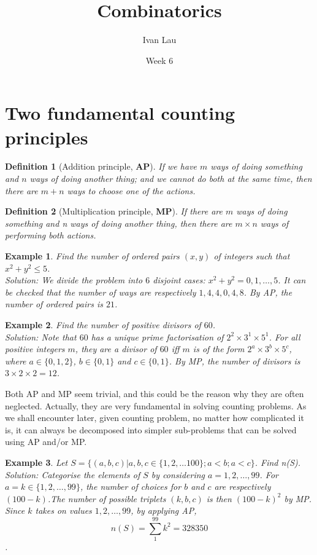 \documentclass[11pt,a5paper]{article}
\title{\textbf{Combinatorics}}
\date{Week 6}
\author{Ivan Lau\\}
\newtheorem{definition}{Definition}
\newtheorem{example}{Example}
\begin{document}
\maketitle


\section{Two fundamental counting principles}

\begin{definition}[Addition principle, \textbf{AP}]
If we have $m$ ways of doing something and $n$ ways of doing another thing; and we cannot do both at the same time, then there are $m+n$ ways to choose one of the actions.
\end{definition}

\begin{definition}[Multiplication principle, \textbf{MP}]
If there are $m$ ways of doing something and n ways of doing another thing, then there are $m \times n$ ways of performing both actions.
\end{definition}

\begin{example} Find the number of ordered pairs $(x,y)$ of integers such that $x^2+y^2 \le 5$.\\
\textit{Solution}: We divide the problem into $6$ disjoint cases: $x^2+y^2 = 0,1,…,5$. It can be checked that the number of ways are respectively $1,4,4,0,4,8$. By AP, the number of ordered pairs is $21$.
\end{example}

\begin{example} Find the number of positive divisors of $60$. \\
\textit{Solution}: Note that $60$ has a unique prime factorisation of $2^2 \times 3^1 \times 5^1$. For all positive integers $m$, they are a divisor of $60$ iff $m$ is of the form $2^a \times 3^b \times 5^c$, where $a \in \{0,1,2\}$, $b \in \{0,1\}$ and $c \in \{0,1\}$. By MP, the number of divisors is $3 \times 2 \times 2 = 12$.
\end{example}

\noindent Both AP and MP seem trivial, and this could be the reason why they are often neglected. Actually, they are very fundamental in solving counting problems. As we shall encounter later, given counting problem, no matter how complicated it is, it can always be decomposed into simpler sub-problems that can be solved using AP and/or MP.

\begin{example} Let $S = \{(a,b,c) | a,b,c \in \{1,2,…100\}; a<b; a<c\}$.  Find n(S). \\
\textit{Solution}: Categorise the elements of $S$ by considering $a = 1,2,…,99$.  For $a = k \in \{1,2,…,99\}$, the number of choices for $b$ and $c$ are respectively $(100-k)$.The number of possible triplets $(k,b,c)$ is then $(100-k)^2$ by MP. Since $k$ takes on values $1,2,…,99$, by applying AP, \[n(S)= \sum_1^{99}{k^2} = 328350\].
\end{example}
\end{document}
